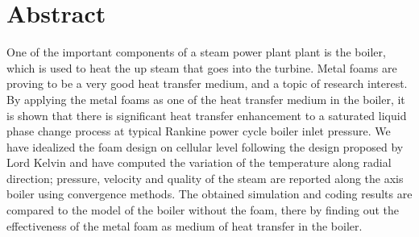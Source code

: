\documentclass[compileTAMUreport.tex]{subfiles}
\begin{document}
\chapter{Abstract}

One of the important components of a steam power plant plant is the boiler, which is used to heat the up steam that goes into the turbine. 
Metal foams are proving to be a very good heat transfer medium, and a topic of research interest. By applying the metal foams as one of the heat transfer medium in the boiler, it is shown that there is significant heat transfer enhancement to a saturated liquid phase change process at typical Rankine power cycle boiler inlet pressure. 
We have idealized the foam design on cellular level following the design proposed by Lord Kelvin and have computed the variation of the temperature along radial direction; pressure, velocity and  quality of the steam are reported along the axis boiler using convergence methods.
The obtained simulation and coding results are compared to the model of the boiler without the foam, there by finding out the effectiveness of the metal foam as medium of heat transfer in the boiler.\cite{Boomsma2011}

\end{document}
